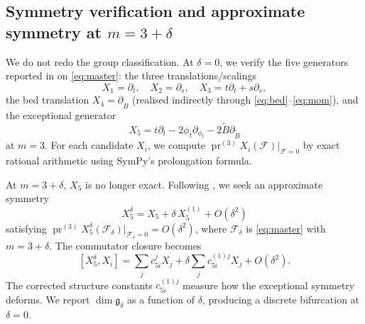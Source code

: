 \documentclass[12pt,a4paper]{article}
\newcommand{\pr}{\operatorname{pr}}
\begin{document}
\begin{center}
\end{center}

\subsection*{Symmetry verification and approximate symmetry at $m=3+\delta$}
We do not redo the group classification. At $\delta=0$, we verify the five generators reported in \cite{sve} on \eqref{eq:master}: the three translations/scalings
\[
X_1=\partial_t,\quad X_2=\partial_s,\quad X_3=t\partial_t+s\partial_s,
\]
the bed translation $X_4=\partial_{\tilde B}$ (realised indirectly through \eqref{eq:bed}--\eqref{eq:mom}), and the exceptional generator
\[
X_5=t\partial_t-2\phi_t\partial_{\phi_t}-2\tilde B\partial_{\tilde B}
\]
at $m=3$. For each candidate $X_i$, we compute $\pr^{(3)}X_i(\mathcal F)|_{\mathcal F=0}$ by exact rational arithmetic using SymPy's prolongation formula.

At $m=3+\delta$, $X_5$ is no longer exact. Following \cite{bgi}, we seek an approximate symmetry
\[
X_5^\delta=X_5+\delta\,X_5^{(1)}+O(\delta^2)
\]
satisfying $\pr^{(3)}X_5^\delta(\mathcal F_\delta)|_{\mathcal F_\delta=0}=O(\delta^2)$, where $\mathcal F_\delta$ is \eqref{eq:master} with $m=3+\delta$. The commutator closure becomes
\[
[X_5^\delta,X_i]=\sum_j c_{5i}^j X_j+\delta\sum_j c_{5i}^{(1)j}X_j+O(\delta^2).
\]
The corrected structure constants $c_{5i}^{(1)j}$ measure how the exceptional symmetry deforms. We report $\dim\mathfrak g_\delta$ as a function of $\delta$, producing a discrete bifurcation at $\delta=0$.

\begin{center}
\end{center}
\end{document}
